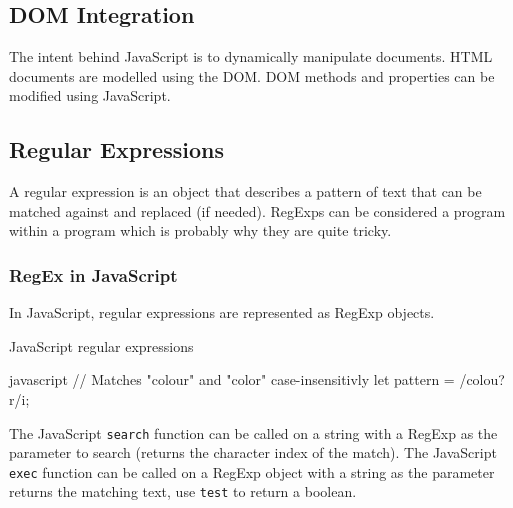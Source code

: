 \subsection{DOM Integration}\label{sub:dom_integration}

The intent behind JavaScript is to dynamically manipulate documents.
HTML documents are modelled using the DOM.
DOM methods and properties can be modified using JavaScript.

\subsection{Regular Expressions}\label{sub:regular_expressions}

A regular expression is an object that describes a pattern of text that can be matched against and replaced (if needed).
RegExps can be considered a program within a program which is probably why they are quite tricky.

\subsubsection{RegEx in JavaScript}\label{ssub:regex_in_javascript}

In JavaScript, regular expressions are represented as RegExp objects.
\begin{highlight}{JavaScript regular expressions}
	\begin{code}{javascript}
		// Matches "colour" and "color" case-insensitivly
		let pattern = /colou?r/i;
	\end{code}
\end{highlight}
The JavaScript \texttt{search} function can be called on a string with a RegExp as the parameter to search (returns the character index of the match).
The JavaScript \texttt{exec} function can be called on a RegExp object with a string as the parameter returns the matching text, use \texttt{test} to return a boolean.
